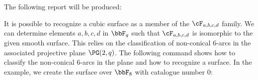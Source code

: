 
The following report will be produced:



\bigskip


It is possible to recognize a cubic surface as a member of the $\cF_{a,b,c,d}$ family.
We can determine elements $a,b,c,d$ in $\bbF_q$ such that 
$\cF_{a,b,c,d}$ is isomorphic to the given smooth surface. 
This relies on the classification of non-conical $6$-arcs in 
the associated projective plane $\PG(2,q)$. 
The following command 
shows how to classify the non-conical $6$-arcs in the plane 
and how to recognize a surface. 
In the example, we create the surface 
over $\bbF_8$ with catalogue number 0:

 



\bigskip








